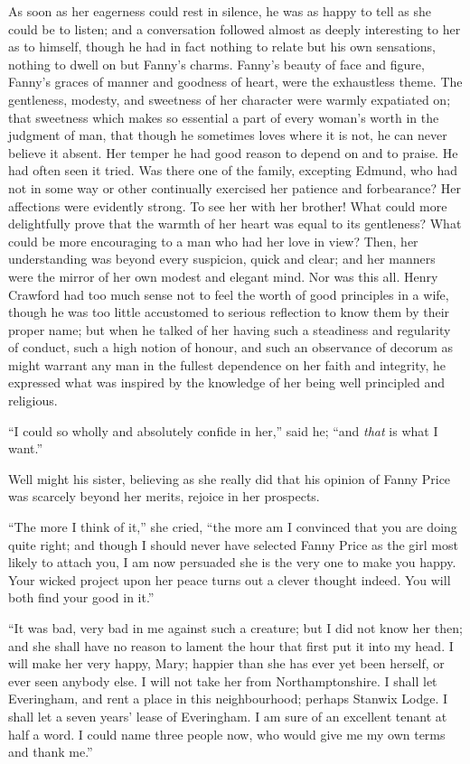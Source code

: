 As soon as her eagerness could rest in silence,
he was as happy to tell as she could be to listen;
and a conversation followed almost as deeply interesting
to her as to himself, though he had in fact nothing
to relate but his own sensations, nothing to dwell on
but Fanny's charms.  Fanny's beauty of face and figure,
Fanny's graces of manner and goodness of heart, were the
exhaustless theme.  The gentleness, modesty, and sweetness
of her character were warmly expatiated on; that sweetness
which makes so essential a part of every woman's worth
in the judgment of man, that though he sometimes loves
where it is not, he can never believe it absent.
Her temper he had good reason to depend on and to praise.
He had often seen it tried.  Was there one of the family,
excepting Edmund, who had not in some way or other
continually exercised her patience and forbearance?
Her affections were evidently strong.  To see her with
her brother!  What could more delightfully prove that
the warmth of her heart was equal to its gentleness?
What could be more encouraging to a man who had her love
in view?  Then, her understanding was beyond every suspicion,
quick and clear; and her manners were the mirror of
her own modest and elegant mind.  Nor was this all.
Henry Crawford had too much sense not to feel the worth of good
principles in a wife, though he was too little accustomed
to serious reflection to know them by their proper name;
but when he talked of her having such a steadiness
and regularity of conduct, such a high notion of honour,
and such an observance of decorum as might warrant any man
in the fullest dependence on her faith and integrity,
he expressed what was inspired by the knowledge of her
being well principled and religious.

``I could so wholly and absolutely confide in her,'' said he;
``and \emph{that} is what I want.''

Well might his sister, believing as she really did that his
opinion of Fanny Price was scarcely beyond her merits,
rejoice in her prospects.

``The more I think of it,'' she cried, ``the more am I convinced
that you are doing quite right; and though I should never have
selected Fanny Price as the girl most likely to attach you,
I am now persuaded she is the very one to make you happy.
Your wicked project upon her peace turns out a clever
thought indeed.  You will both find your good in it.''

``It was bad, very bad in me against such a creature;
but I did not know her then; and she shall have no reason
to lament the hour that first put it into my head.
I will make her very happy, Mary; happier than she has ever
yet been herself, or ever seen anybody else.  I will not
take her from Northamptonshire.  I shall let Everingham,
and rent a place in this neighbourhood; perhaps Stanwix Lodge.
I shall let a seven years' lease of Everingham.
I am sure of an excellent tenant at half a word.
I could name three people now, who would give me my own
terms and thank me.''

